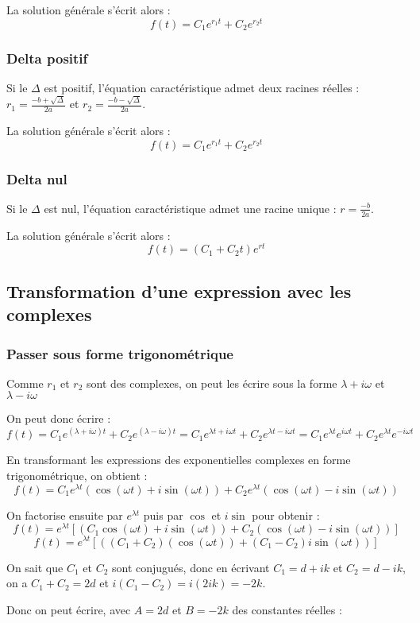 \documentclass[french]{yLectureNote}
\begin{document}
La solution générale s'écrit alors  : \[f(t)=C_1e^{r_1t} + C_2e^{r_2t}\]

\subsubsection{Delta positif}
Si le $\Delta$ est positif, l'équation caractéristique admet deux racines réelles : $r_1 = \frac{-b+\sqrt{\Delta}}{2a}$ et $r_2 = \frac{-b-\sqrt{\Delta}}{2a}$.

La solution générale s'écrit alors  : \[f(t)=C_1e^{r_1t} + C_2e^{r_2t}\]
\subsubsection{Delta nul}
Si le $\Delta$ est nul, l'équation caractéristique admet une racine unique : $r = \frac{-b}{2a}$.

La solution générale s'écrit alors  : \[f(t)=(C_1+C_2t)e^{rt}\]
\subsection{Transformation d'une expression avec les complexes}
\subsubsection{Passer sous forme trigonométrique}

Comme $r_1$ et $r_2$ sont des complexes, on peut les écrire sous la forme $\lambda+i\omega$ et $\lambda-i\omega$

On peut donc écrire :  \[f(t)=C_1e^{(\lambda+i\omega)t} + C_2e^{(\lambda-i\omega)t} = C_1e^{\lambda t+i\omega t} + C_2e^{\lambda t - i\omega t} = C_1e^{\lambda t}e^{i\omega t} + C_2e^{\lambda t}e^{-i\omega t}\]

En transformant les expressions des exponentielles complexes en forme trigonométrique, on obtient :
\[f(t) = C_1e^{\lambda t}(\cos(\omega t) + i\sin(\omega t)) + C_2e^{\lambda t}(\cos(\omega t) - i\sin(\omega t))\]

On factorise ensuite par $e^{\lambda t}$ puis par $\cos$ et $i\sin$ pour obtenir :
\[f(t) = e^{\lambda t}[(C_1\cos(\omega t) + i\sin(\omega t)) + C_2(\cos(\omega t) - i\sin(\omega t))]\]
\[f(t) = e^{\lambda t}[((C_1+C_2)(\cos(\omega t)) + (C_1-C_2)i\sin(\omega t))]\]

On sait que $C_1$ et $C_2$ sont conjugués, donc en écrivant $C_1 = d+ik$ et $C_2 = d-ik$, on a $C_1+C_2 = 2d$ et $i(C_1-C_2) = i(2ik) = -2k$.

Donc on peut écrire, avec $A = 2d$ et $B = -2k$ des constantes réelles :
\end{document}
